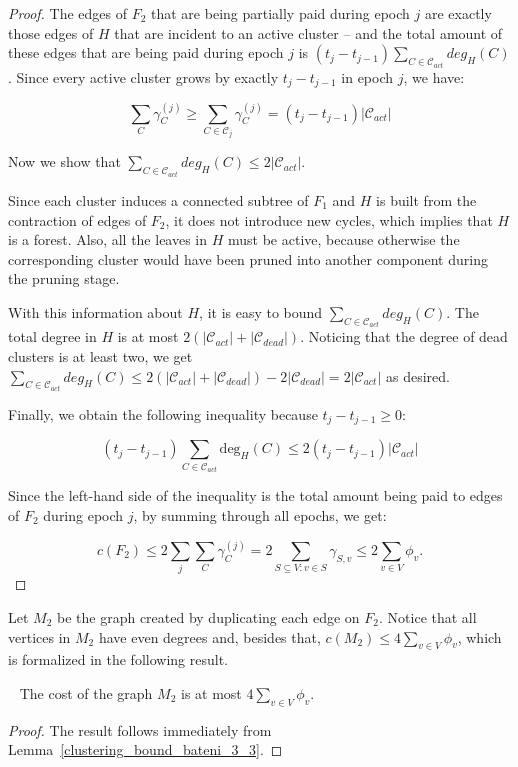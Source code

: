 \begin{proof}
The edges of \(F_2\) that are being partially paid during epoch \(j\) are exactly those edges of \(H\) that are incident to an active cluster -- and the total amount of these edges that are being paid during epoch \(j\) is \((t_j - t_{j - 1}) \sum_{C \in \mathcal{C}_{act}} deg_H(C)\). Since every active cluster grows by exactly \(t_j - t_{j - 1}\) in epoch \(j\), we have:

$$\sum_C \gamma_C^{(j)} \geq \sum_{C \in \mathcal{C}_j} \gamma_C^{(j)} = (t_j - t_{j - 1}) |\mathcal{C}_{act}|$$

Now we show that \(\sum_{C \in \mathcal{C}_{act}} deg_H(C) \leq 2|\mathcal{C}_{act}|\).

Since each cluster induces a connected subtree of \(F_1\) and \(H\) is built from the contraction of edges of \(F_2\), it does not introduce new cycles, which implies that \(H\) is a forest. 
Also, all the leaves in \(H\) must be active, because otherwise the corresponding cluster would have been pruned into another component during the pruning stage.

With this information about \(H\), it is easy to bound \(\sum_{C \in \mathcal{C}_{act}} deg_H(C)\). The total degree in \(H\) is at most \(2 (|\mathcal{C}_{act}| + |\mathcal{C}_{dead}|)\). Noticing that the degree of dead clusters is at least two, we get \(\sum_{C \in \mathcal{C}_{act}} deg_H(C) \leq 2 (|\mathcal{C}_{act}| + |\mathcal{C}_{dead}|) - 2|\mathcal{C}_{dead}| = 2|\mathcal{C}_{act}|\) as desired.

Finally, we obtain the following inequality because $t_j-t_{j-1} \ge 0$:

$$(t_j - t_{j - 1}) \sum_{C \in \mathcal{C}_{act}} \mathrm{deg}_H(C) \leq 2 (t_j - t_{j - 1}) |\mathcal{C}_{act}|$$

Since the left-hand side of the inequality is the total amount being paid to edges of \(F_2\) during epoch \(j\), by summing through all epochs, we get:

$$c(F_2) \leq 2 \sum_j \sum_C \gamma_C^{(j)} = 2 \sum_{S \subseteq V : v \in S} \gamma_{S, v} \leq 2 \sum_{v \in V} \phi_v.$$

\end{proof}

Let \(M_2\) be the graph created by duplicating each edge on \(F_2\). Notice that all vertices in \(M_2\) have even degrees and, besides that, \(c(M_2) \leq 4 \sum_{v \in V} \phi_v\), which is formalized in the following result.

\begin{fcorollary}~\label{corollary_1}
The cost of the graph \(M_2\) is at most \(4 \sum_{v \in V} \phi_v\).
\end{fcorollary}
\begin{proof}
    The result follows immediately from Lemma~\ref{clustering_bound_bateni_3_3}.
\end{proof}


